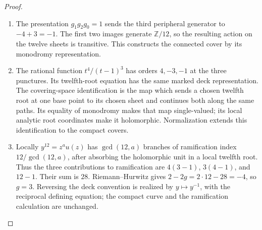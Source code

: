 \begin{proof}
\begin{enumerate}[label=\arabic*.,leftmargin=*]
\item The presentation $g_1g_2g_0=1$ sends the third peripheral generator
to $-4+3=-1$. The first two images generate $\mathbb Z/12$, so
the resulting action on the twelve sheets is transitive. This
constructs the connected cover by its monodromy representation.

\item The rational function $t^4/(t-1)^3$ has orders $4,-3,-1$ at the
three punctures. Its twelfth-root equation has the same marked
deck representation. The covering-space identification is the map
which sends a chosen twelfth root at one base point to its chosen
sheet and continues both along the same paths. Its equality of
monodromy makes that map single-valued; its local analytic root
coordinates make it holomorphic. Normalization extends this
identification to the compact covers.

\item Locally $y^{12}=z^a u(z)$ has $\gcd(12,a)$ branches of ramification
index $12/\gcd(12,a)$, after absorbing the holomorphic unit in a
local twelfth root. Thus the three contributions to ramification
are $4(3-1)$, $3(4-1)$, and $12-1$. Their sum is $28$.
Riemann--Hurwitz gives $2-2g=2\cdot12-28=-4$, so $g=3$.
Reversing the deck convention is realized by $y\mapsto y^{-1}$,
with the reciprocal defining equation; the compact curve and the
ramification calculation are unchanged.
\end{enumerate}
\end{proof}


